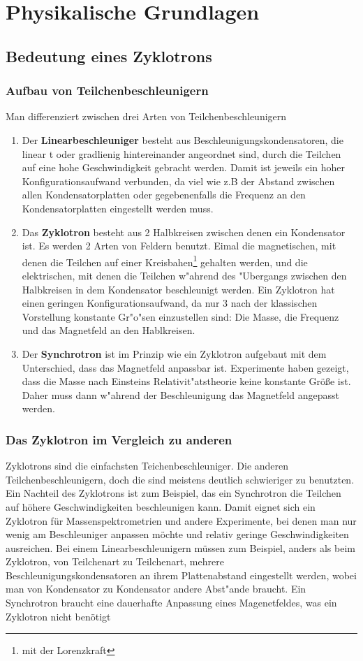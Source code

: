 \documentclass[14pt, a4paper]{report}
\begin{document}
\part{Physikalische Grundlagen}
\chapter{Bedeutung eines Zyklotrons}
\section{Aufbau von Teilchenbeschleunigern}
Man differenziert zwischen drei Arten von Teilchenbeschleunigern \footnotemark
{}
\begin{enumerate}
\item
Der \textbf{Linearbeschleuniger} besteht aus Beschleunigungskondensatoren, die linear
t oder gradlienig hintereinander angeordnet sind, durch die
Teilchen auf eine hohe Geschwindigkeit gebracht werden. Damit ist jeweils ein hoher
Konfigurationsaufwand verbunden, da viel wie z.B der Abstand zwischen allen
Kondensatorplatten oder gegebenenfalls die Frequenz an den Kondensatorplatten 
eingestellt werden muss.
\item
Das \textbf{Zyklotron} besteht aus 2 Halbkreisen zwischen denen ein Kondensator ist.
Es werden 2 Arten von Feldern benutzt. Eimal die magnetischen, mit denen die 
Teilchen auf einer Kreisbahen\footnote{mit der Lorenzkraft}
gehalten werden, und die elektrischen, 
mit denen die Teilchen w"ahrend des "Ubergangs zwischen den Halbkreisen in dem 
Kondensator beschleunigt werden. Ein Zyklotron hat einen geringen 
Konfigurationsaufwand, da nur 3 nach der klassischen Vorstellung konstante Gr"o"sen
einzustellen sind: Die Masse, die Frequenz und das Magnetfeld an den Hablkreisen. 
\item
Der \textbf{Synchrotron} ist im Prinzip wie ein Zyklotron aufgebaut mit dem 
Unterschied, dass das Magnetfeld anpassbar ist. Experimente haben gezeigt, dass die
Masse nach Einsteins Relativit"atstheorie keine konstante Größe ist. Daher muss 
dann w"ahrend der Beschleunigung das Magnetfeld angepasst werden.
\end{enumerate}

\section{Das Zyklotron im Vergleich zu anderen}
Zyklotrons sind die einfachsten Teichenbeschleuniger. Die anderen 
Teilchenbeschleunigern, doch die sind meistens deutlich schwieriger zu benutzten. 
Ein Nachteil des Zyklotrons ist zum Beispiel, das ein Synchrotron die Teilchen auf 
höhere Geschwindigkeiten beschleunigen kann. Damit eignet sich ein Zyklotron für 
Massenspektrometrien und andere Experimente, bei denen man nur wenig am 
Beschleuniger anpassen möchte und relativ geringe Geschwindigkeiten ausreichen. 
Bei einem Linearbeschleunigern müssen zum Beispiel, anders als beim Zyklotron, von 
Teilchenart zu Teilchenart, mehrere Beschleunigungskondensatoren an ihrem 
Plattenabstand eingestellt werden, wobei man von Kondensator zu Kondensator andere
Abst"ande braucht. Ein Synchrotron braucht eine dauerhafte Anpassung eines 
Magenetfeldes, was ein Zyklotron nicht benötigt
\end{document}
